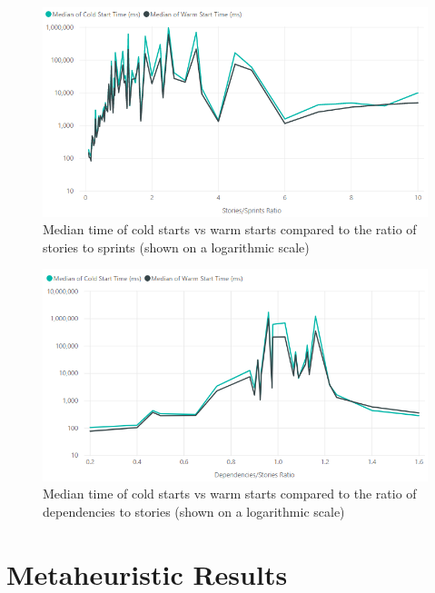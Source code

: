 \begin{figure}[h!]
    \centering
    \includegraphics[width=\textwidth]{Figures/WarmVsColdStarts/warm_vs_cold_stories_sprints_ratio.png}
     \caption{Median time of cold starts vs warm starts compared to the ratio of stories to sprints (shown on a logarithmic scale)}
     \label{fig:warm_vs_cold_starts_stories_sprints_ratio}
\end{figure}

\begin{figure}[h!]
    \centering
    \includegraphics[width=\textwidth]{Figures/WarmVsColdStarts/warm_vs_cold_dependencies_stories_ratio.png}
     \caption{Median time of cold starts vs warm starts compared to the ratio of dependencies to stories (shown on a logarithmic scale)}
     \label{fig:warm_vs_cold_starts_dependencies_stories_ratio}
\end{figure}

\FloatBarrier

\section{Metaheuristic Results}

